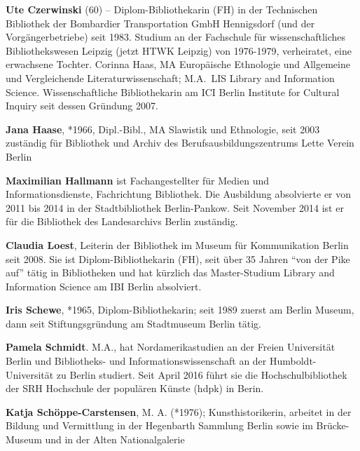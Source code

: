\documentclass[a4paper,
fontsize=11pt,
oneside,
numbers=noperiodatend,
parskip=half-,
bibliography=totoc,
final
]{scrartcl}
\begin{document}
\textbf{Ute Czerwinski} (60) -- Diplom-Bibliothekarin (FH) in der
Technischen Bibliothek der Bombardier Transportation GmbH Hennigsdorf
(und der Vorgängerbetriebe) seit 1983. Studium an der Fachschule für
wissenschaftliches Bibliothekswesen Leipzig (jetzt HTWK Leipzig) von
1976-1979, verheiratet, eine erwachsene Tochter. Corinna Haas, MA
Europäische Ethnologie und Allgemeine und Vergleichende
Literaturwissenschaft; M.A.~LIS Library and Information Science.
Wissenschaftliche Bibliothekarin am ICI Berlin Institute for Cultural
Inquiry seit dessen Gründung 2007.

\textbf{Jana Haase}, *1966, Dipl.-Bibl., MA Slawistik und Ethnologie,
seit 2003 zuständig für Bibliothek und Archiv des
Berufsausbildungszentrums Lette Verein Berlin

\textbf{Maximilian Hallmann} ist Fachangestellter für Medien und
Informationsdienste, Fachrichtung Bibliothek. Die Ausbildung absolvierte
er von 2011 bis 2014 in der Stadtbibliothek Berlin-Pankow. Seit November
2014 ist er für die Bibliothek des Landesarchivs Berlin zuständig.

\textbf{Claudia Loest}, Leiterin der Bibliothek im Museum für
Kommunikation Berlin seit 2008. Sie ist Diplom-Bibliothekarin (FH), seit
über 35 Jahren ``von der Pike auf'' tätig in Bibliotheken und hat
kürzlich das Master-Studium Library and Information Science am IBI
Berlin absolviert.

\textbf{Iris Schewe}, *1965, Diplom-Bibliothekarin; seit 1989 zuerst am
Berlin Museum, dann seit Stiftungsgründung am Stadtmuseum Berlin tätig.

\textbf{Pamela Schmidt}. M.A., hat Nordamerikastudien an der Freien
Universität Berlin und Bibliotheks- und Informationswissenschaft an der
Humboldt-Universität zu Berlin studiert. Seit April 2016 führt sie die
Hochschulbibliothek der SRH Hochschule der populären Künste (hdpk) in
Berin.

\textbf{Katja Schöppe-Carstensen}, M. A. (*1976); Kunsthistorikerin,
arbeitet in der Bildung und Vermittlung in der Hegenbarth Sammlung
Berlin sowie im Brücke-Museum und in der Alten Nationalgalerie
\end{document}
